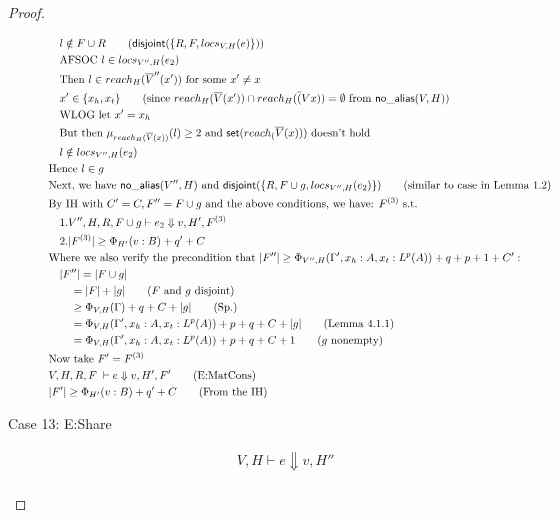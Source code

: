\documentclass[11pt]{article}
\newcommand{\ms}[1]{\ensuremath{\mathsf{#1}}}
\newcommand{\na}[1]{\mathsf{no\_alias}(#1)}
\newcommand{\dist}[1]{\mathsf{disjoint}(#1)}
\theoremstyle{definition}
\begin{document}
\begin{proof}
\begin{description}
\begin{align*}
  &\quad l \notin F \cup R \tag{$\dist{\{R,F,locs_{V,H}(e)\}}$}\\
  &\quad \text{AFSOC } l \in locs_{V'',H}(e_2)\\
  &\quad \text{Then } l \in reach_H(\overline V'' (x')) \text{ for some } x' \ne x\\
  &\quad x' \in \{x_h,x_t\} \tag{since $reach_H(\overline V (x')) \cap reach_H(\overline (Vx)) = \emptyset$ from $\na{V,H}$}\\
  &\quad \text{WLOG let } x' = x_h\\
  &\quad \text{But then } \mu_{reach_H(\overline V(x))}(l) \ge 2 \text{ and } \ms{set}(reach_(\overline V(x))) \text{ doesn't hold}\\
  &\quad l \notin locs_{V'',H}(e_2)\\
  &\text{Hence } l \in g\\
	&\text{Next, we have } \na{V'',H} \text{ and } \dist{\{R,F \cup g,locs_{V'',H}(e_2)\}} \tag{similar to case in Lemma 1.2}\\
	&\text{By IH with } C' = C, F'' = F \cup g \text{ and the above conditions, we have: } F^{(3)} \text{ s.t.}\\
	&\quad 1. V'',H,R,F\cup g \vdash e_2 \Downarrow v,H',F^{(3)}\\
	&\quad 2. |F^{(3)}| \ge \Phi_{H'}(v:B) + q' + C\\
	&\text{Where we also verify the precondition that } |F''| \ge \Phi_{V'',H}(\Gamma',x_h:A,x_t:L^p(A)) + q + p + 1 + C':\\
	&\quad |F''| = |F \cup g|\\
	&\quad \quad = |F| + |g| \tag{$F$ and $g$ disjoint}\\
	&\quad \quad \ge \Phi_{V,H}(\Gamma) + q + C + |g| \tag{Sp.}\\
	&\quad \quad = \Phi_{V,H}(\Gamma',x_h:A,x_t:L^p(A)) + p + q + C + |g| \tag{Lemma 4.1.1}\\
	&\quad \quad = \Phi_{V,H}(\Gamma',x_h:A,x_t:L^p(A)) + p + q + C + 1 \tag{$g$ nonempty}\\
	&\text{Now take } F' = F^{(3)}\\
	&V,H,R,F \; \vdash e \Downarrow v,H',F' \tag{E:MatCons}\\
  &|F'| \ge \Phi_{H'}(v:B) + q' + C \tag{From the IH}\\
  \end{align*}
  \item[Case 13: E:Share]
	\begin{align*}
	&V,H \vdash e \Downarrow v,H'' \tag{case}\\

\end{align*}
\end{description}
\end{proof}
\end{document}
